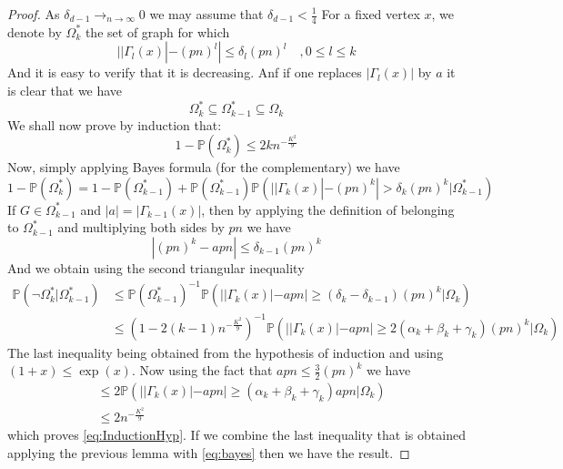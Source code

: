 \begin{proof}
	As $\delta_{d-1} \longrightarrow_{n\to\infty} 0$ we may assume that $\delta_{d-1} < \frac{1}{4}$
	For a fixed vertex $x$, we denote by $\Omega_k^*$ the set of graph for which 
	\begin{equation}
		||\Gamma_l(x)| - (pn)^l| \leq \delta_l(pn)^l \quad , 0 \leq l \leq k
	\end{equation}
	And it is easy to verify that it is decreasing. Anf if one replaces $|\Gamma_l(x)|$ by $a$ it is clear that we have
	\begin{equation}
		\Omega_k^* \subseteq \Omega_{k-1}^* \subseteq \Omega_k
	\end{equation}
	We shall now prove by induction that:
	\begin{equation}\label{eq:InductionHyp}
		1 - \mathbb{P}(\Omega_k^*)\leq 2kn^{-\frac{K^2}{9}}
	\end{equation}
	Now, simply applying Bayes formula (for the complementary) we have
	\begin{equation}\label{eq:bayes}
		1 - \mathbb{P}(\Omega_k^*)= 1-\mathbb{P}(\Omega_{k-1}^*)
		+ \mathbb{P}(\Omega_{k-1}^*)\mathbb{P}(||\Gamma_k(x)| - (pn)^k| > \delta_k(pn)^k | \Omega_{k-1}^*)
	\end{equation}
	If $G \in \Omega_{k-1}^*$ and $|a| = |\Gamma_{k-1}(x)|$, then by applying the definition of belonging to $\Omega_{k-1}^*$ and multiplying both sides by $pn$ we have 
	\begin{equation}
		|(pn)^k - apn| \leq \delta_{k-1}(pn)^k
	\end{equation}
	And we obtain using the second triangular inequality
	\begin{align}
		\mathbb{P}(\neg\Omega_k^* | \Omega_{k-1}^*) 
		&\leq \mathbb{P}(\Omega_{k-1}^*)^{-1}\mathbb{P}(||\Gamma_k(x)| - apn| \geq (\delta_k - \delta_{k-1})(pn)^k | \Omega_k)\\
		&\leq (1 - 2(k-1)n^{-\frac{K^2}{9}})^{-1}\mathbb{P}(||\Gamma_k(x)| - apn| \geq 2(\alpha_k + \beta_k + \gamma_k)(pn)^k | \Omega_k)
	\end{align}
	The last inequality being obtained from the hypothesis of induction and using $(1+x) \leq \exp(x)$. Now using the fact that $apn \leq \frac{3}{2} (pn)^k$ we have
	\begin{align}
		&\leq 2\mathbb{P}(||\Gamma_k(x)| - apn| \geq (\alpha_k + \beta_k + \gamma_k)apn | \Omega_k)\\
		&\leq 2n^{-\frac{K^2}{9}}
	\end{align}
	which proves \eqref{eq:InductionHyp}.
	If we combine the last inequality that is obtained applying the previous lemma with \eqref{eq:bayes} then we have the result.
\end{proof}

